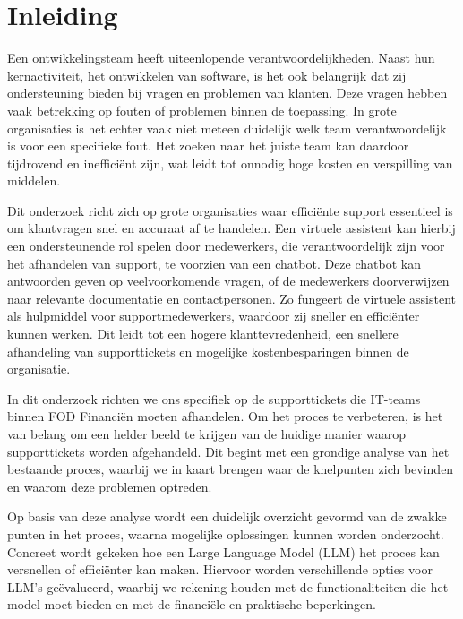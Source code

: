 
\section{Inleiding}%
\label{sec:inleiding}

Een ontwikkelingsteam heeft uiteenlopende verantwoordelijkheden. Naast hun kernactiviteit, het ontwikkelen van software, is het ook belangrijk dat zij ondersteuning bieden bij vragen en problemen van klanten. Deze vragen hebben vaak betrekking op fouten of problemen binnen de toepassing. In grote organisaties is het echter vaak niet meteen duidelijk welk team verantwoordelijk is voor een specifieke fout. Het zoeken naar het juiste team kan daardoor tijdrovend en inefficiënt zijn, wat leidt tot onnodig hoge kosten en verspilling van middelen.

Dit onderzoek richt zich op grote organisaties waar efficiënte support essentieel is om klantvragen snel en accuraat af te handelen. Een virtuele assistent kan hierbij een ondersteunende rol spelen door medewerkers, die verantwoordelijk zijn voor het afhandelen van support, te voorzien van een chatbot. Deze chatbot kan antwoorden geven op veelvoorkomende vragen, of de medewerkers doorverwijzen naar relevante documentatie en contactpersonen. Zo fungeert de virtuele assistent als hulpmiddel voor supportmedewerkers, waardoor zij sneller en efficiënter kunnen werken. Dit leidt tot een hogere klanttevredenheid, een snellere afhandeling van supporttickets en mogelijke kostenbesparingen binnen de organisatie.

In dit onderzoek richten we ons specifiek op de supporttickets die IT-teams binnen FOD Financiën moeten afhandelen. Om het proces te verbeteren, is het van belang om een helder beeld te krijgen van de huidige manier waarop supporttickets worden afgehandeld. Dit begint met een grondige analyse van het bestaande proces, waarbij we in kaart brengen waar de knelpunten zich bevinden en waarom deze problemen optreden.

Op basis van deze analyse wordt een duidelijk overzicht gevormd van de zwakke punten in het proces, waarna mogelijke oplossingen kunnen worden onderzocht. Concreet wordt gekeken hoe een Large Language Model (LLM) het proces kan versnellen of efficiënter kan maken. Hiervoor worden verschillende opties voor LLM’s geëvalueerd, waarbij we rekening houden met de functionaliteiten die het model moet bieden en met de financiële en praktische beperkingen.

